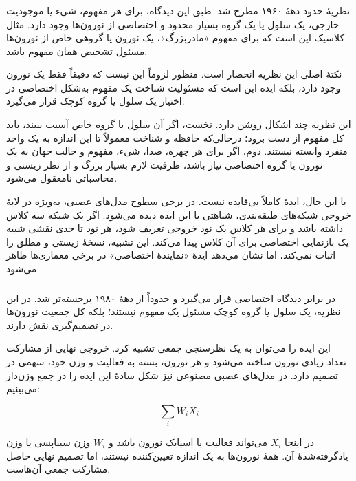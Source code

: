 \subsubsection{}
نظریهٔ  حدود دههٔ ۱۹۶۰ مطرح شد. طبق این دیدگاه، برای هر مفهوم، شیء یا موجودیت خارجی، یک سلول یا یک گروه بسیار محدود و اختصاصی از نورون‌ها وجود دارد. مثال کلاسیک این است که برای مفهوم «مادربزرگ»، یک نورون یا گروهی خاص از نورون‌ها مسئول تشخیص همان مفهوم باشد.

نکتهٔ اصلی این نظریه انحصار است. منظور لزوماً این نیست که دقیقاً فقط یک نورون وجود دارد، بلکه ایده این است که مسئولیت شناخت یک مفهوم به‌شکل اختصاصی در اختیار یک سلول یا گروه کوچک قرار می‌گیرد.

این نظریه چند اشکال روشن دارد. نخست، اگر آن سلول یا گروه خاص آسیب ببیند، باید کل مفهوم از دست برود؛ درحالی‌که حافظه و شناخت معمولاً تا این اندازه به یک واحد منفرد وابسته نیستند. دوم، اگر برای هر چهره، صدا، شیء، مفهوم و حالت جهان به یک نورون یا گروه اختصاصی نیاز باشد، ظرفیت لازم بسیار بزرگ و از نظر زیستی و محاسباتی نامعقول می‌شود.

با این حال، ایدهٔ  کاملاً بی‌فایده نیست. در برخی سطوح مدل‌های عصبی، به‌ویژه در لایهٔ خروجی شبکه‌های طبقه‌بندی، شباهتی با این ایده دیده می‌شود. اگر یک شبکه سه کلاس داشته باشد و برای هر کلاس یک نود خروجی تعریف شود، هر نود تا حدی نقشی شبیه یک بازنمایی اختصاصی برای آن کلاس پیدا می‌کند. این تشبیه، نسخهٔ زیستی و مطلق  را اثبات نمی‌کند، اما نشان می‌دهد ایدهٔ «نمایندهٔ اختصاصی» در برخی معماری‌ها ظاهر می‌شود.

\subsubsection{}
 در برابر دیدگاه اختصاصی  قرار می‌گیرد و حدوداً از دههٔ ۱۹۸۰ برجسته‌تر شد. در این نظریه، یک سلول یا گروه کوچک مسئول یک مفهوم نیستند؛ بلکه کل جمعیت نورون‌ها در تصمیم‌گیری نقش دارند.

این ایده را می‌توان به یک نظرسنجی جمعی تشبیه کرد. خروجی نهایی از مشارکت تعداد زیادی نورون ساخته می‌شود و هر نورون، بسته به فعالیت و وزن خود، سهمی در تصمیم دارد. در مدل‌های عصبی مصنوعی نیز شکل سادهٔ این ایده را در جمع وزن‌دار می‌بینیم:

\[
\sum_i W_i X_i
\]

در اینجا \(X_i\) می‌تواند فعالیت یا اسپایک نورون باشد و \(W_i\) وزن سیناپسی یا وزن یادگرفته‌شدهٔ آن. همهٔ نورون‌ها به یک اندازه تعیین‌کننده نیستند، اما تصمیم نهایی حاصل مشارکت جمعی آن‌هاست.

